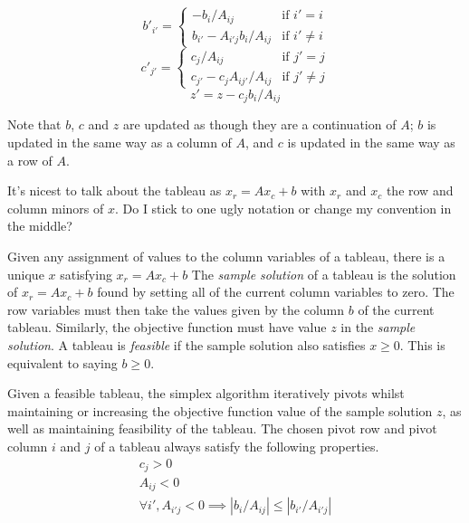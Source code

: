 \documentclass[11pt]{article} %
\begin{document}
\begin{equation}\label{eqn:pivot_const}
  b'_{i'} = \begin{cases}
    -b_i/A_{ij} & \text{if } i' = i \\
    b_{i'} - A_{i'j}b_i/A_{ij} & \text{if } i' \ne i
  \end{cases}
\end{equation}
\begin{equation}
  c'_{j'} = \begin{cases}
    c_j/A_{ij} & \text{if } j' = j \\
    c_{j'} - c_jA_{ij'}/A_{ij} & \text{if } j' \ne j
  \end{cases}
\end{equation}
\begin{equation}\label{eqn:pivot_obj}
  z' = z - c_jb_i/A_{ij}
\end{equation}

Note that $b$, $c$ and $z$ are updated as though they are a continuation of $A$; $b$ is updated in the same way as a column of $A$, and $c$ is updated in the same way as a row of $A$.

\color{red} It's nicest to talk about the tableau as $x_r = Ax_c + b$ with $x_r$ and $x_c$ the row and column minors of $x$. Do I stick to one ugly notation or change my convention in the middle? \color{black}

Given any assignment of values to the column variables of a tableau, there is a unique $x$ satisfying $x_r=Ax_c+b$ The \textit{sample solution} of a tableau is the solution of $x_r = Ax_c+b$ found by setting all of the current column variables to zero. The row variables must then take the values given by the column $b$ of the current tableau. Similarly, the objective function must have value $z$ in the \textit{sample solution}. A tableau is \textit{feasible} if the sample solution also satisfies $x \ge 0$. This is equivalent to saying $b \ge 0$.

Given a feasible tableau, the simplex algorithm iteratively pivots whilst maintaining or increasing the objective function value of the sample solution $z$, as well as maintaining feasibility of the tableau. The chosen pivot row and pivot column $i$ and $j$ of a tableau always satisfy the following properties.
\begin{equation}\label{eqn:valid_pivot}
  \begin{aligned}
    c_j > 0 \\
    A_{ij} < 0 \\
    \forall i', A_{i'j} < 0 \implies \left|b_i/A_{ij}\right| \le \left|b_{i'} / A_{i'j}\right|
  \end{aligned}
\end{equation}
\end{document}
